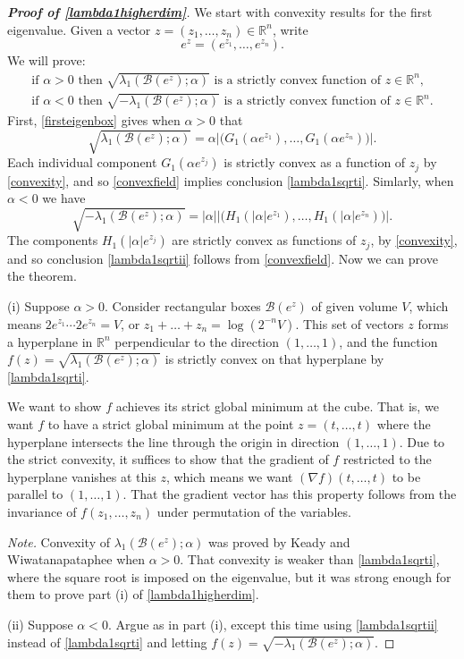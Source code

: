 \documentclass[12pt,reqno]{amsart}
\theoremstyle{definition}
\newcommand{\go}{G_1}
\newcommand{\ho}{H_1}
\newcommand{\Rn}{{\mathbb R}^n}
\begin{document}
\begin{proof}[\bf Proof of \autoref{lambda1higherdim}]
We start with convexity results for the first eigenvalue. Given a vector $z = (z_1,\dots,z_n) \in \Rn$, write
\[
e^z = (e^{z_1},\dots,e^{z_n}) .
\]
We will prove:
%
\begin{align}
\text{if $\alpha>0$ then $\sqrt{\lambda_1(\mathcal{B}(e^z);\alpha)}$ is a strictly convex function of $z \in \Rn$,} \label{lambda1sqrti} \\
\text{if $\alpha<0$ then $\sqrt{-\lambda_1(\mathcal{B}(e^z);\alpha)}$ is a strictly convex function of $z \in \Rn$.} \label{lambda1sqrtii}
\end{align}
%
First, \autoref{firsteigenbox} gives when $\alpha>0$ that
\[
\sqrt{\lambda_1(\mathcal{B}(e^z);\alpha)} 
= \alpha \left| \big( \go(\alpha e^{z_1}), \dots , \go(\alpha e^{z_n}) \big) \right| .
\]
Each individual component $\go(\alpha e^{z_j})$ is strictly convex as a function of $z_j$ by \autoref{convexity}, and so \autoref{convexfield} implies conclusion \eqref{lambda1sqrti}. Simlarly, when $\alpha<0$ we have
\[
\sqrt{-\lambda_1(\mathcal{B}(e^z);\alpha)} 
= |\alpha| \left| \big( \ho(|\alpha| e^{z_1}), \dots , \ho(|\alpha| e^{z_n}) \big) \right| .
\]
The components $\ho(|\alpha| e^{z_j})$ are strictly convex as functions of $z_j$, by \autoref{convexity}, and so conclusion \eqref{lambda1sqrtii} follows from \autoref{convexfield}. Now we can prove the theorem. 

(i) Suppose $\alpha>0$. Consider rectangular boxes $\mathcal{B}(e^z)$ of given volume $V$, which means $2e^{z_1} \cdots 2e^{z_n}=V$, or $z_1 + \dots + z_n = \log(2^{-n}V)$. This set of vectors $z$ forms a hyperplane in $\Rn$ perpendicular to the direction $(1,\dots,1)$, and the function $f(z)=\sqrt{\lambda_1(\mathcal{B}(e^z);\alpha)}$ is strictly convex on that hyperplane by \eqref{lambda1sqrti}. 

We want to show $f$ achieves its strict global minimum at the cube. That is, we want $f$ to have a strict global minimum at the point $z=(t,\dots,t)$ where the hyperplane intersects the line through the origin in direction $(1,\dots,1)$. Due to the strict convexity, it suffices to show that the gradient of $f$ restricted to the hyperplane vanishes at this $z$, which means we want $(\nabla f) (t,\dots,t)$ to be parallel to $(1,\dots,1)$. That the gradient vector has this property follows from the invariance of $f(z_1,\dots,z_n)$ under permutation of the variables. 

\emph{Note.} Convexity of $\lambda_1(\mathcal{B}(e^z);\alpha)$ was proved by Keady and Wiwatanapataphee \cite[Corollary 2]{KW18} when $\alpha>0$. That convexity is weaker than \eqref{lambda1sqrti}, where the square root is imposed on the eigenvalue, but it was strong enough for them to prove part (i) of \autoref{lambda1higherdim}.

\smallskip
(ii) Suppose $\alpha<0$. Argue as in part (i), except this time using \eqref{lambda1sqrtii} instead of \eqref{lambda1sqrti} and letting $f(z)=\sqrt{-\lambda_1(\mathcal{B}(e^z);\alpha)}$. 
\end{proof}
%
\end{document}
